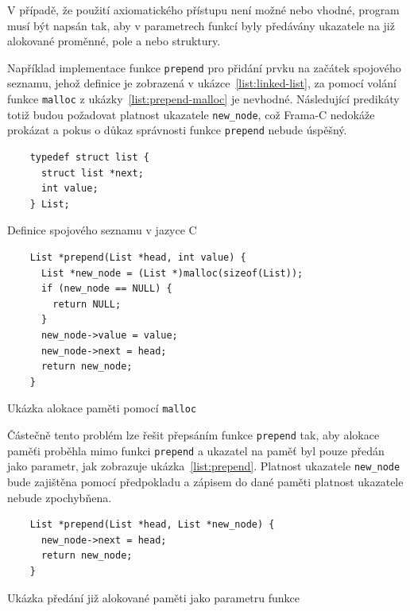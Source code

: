 V případě, že použití axiomatického přístupu není možné nebo vhodné,
program musí být napsán tak,
aby v parametrech funkcí byly předávány ukazatele na již alokované proměnné,
pole a nebo struktury.

Například implementace funkce \texttt{prepend} pro přidání prvku na začátek spojového seznamu,
jehož definice je zobrazená v ukázce~\ref{list:linked-list},
za pomocí volání funkce \texttt{malloc} z ukázky~\ref{list:prepend-malloc} je nevhodné.
Následující predikáty totiž budou požadovat platnost ukazatele \texttt{new\_node},
což Frama\mbox{-}C nedokáže prokázat a pokus o důkaz správnosti funkce \texttt{prepend} nebude úspěšný.

\begin{listing}[H]
    \begin{verbatim}
    typedef struct list {
      struct list *next;
      int value;
    } List;
    \end{verbatim}
    \caption{Definice spojového seznamu v jazyce C}
    \label{list:linked-list}
\end{listing}

\begin{listing}[H]
    \begin{verbatim}
    List *prepend(List *head, int value) {
      List *new_node = (List *)malloc(sizeof(List));
      if (new_node == NULL) {
        return NULL;
      }
      new_node->value = value;
      new_node->next = head;
      return new_node;
    }
    \end{verbatim}
    \caption{Ukázka alokace paměti pomocí \texttt{malloc}}
    \label{list:prepend-malloc}
\end{listing}

Částečně tento problém lze řešit přepsáním funkce \texttt{prepend} tak,
aby alokace paměťi proběhla mimo funkci \texttt{prepend}
a ukazatel na paměť byl pouze předán jako parametr,
jak zobrazuje ukázka~\ref{list:prepend}.
Platnost ukazatele \texttt{new\_node} bude zajištěna pomocí předpokladu
a zápisem do dané paměti platnost ukazatele nebude zpochybňena.

\begin{listing}[H]
    \begin{verbatim}
    List *prepend(List *head, List *new_node) {
      new_node->next = head;
      return new_node;
    }
    \end{verbatim}
    \caption{Ukázka předání již alokované paměti jako parametru funkce}
    \label{list:prepend}
\end{listing}

